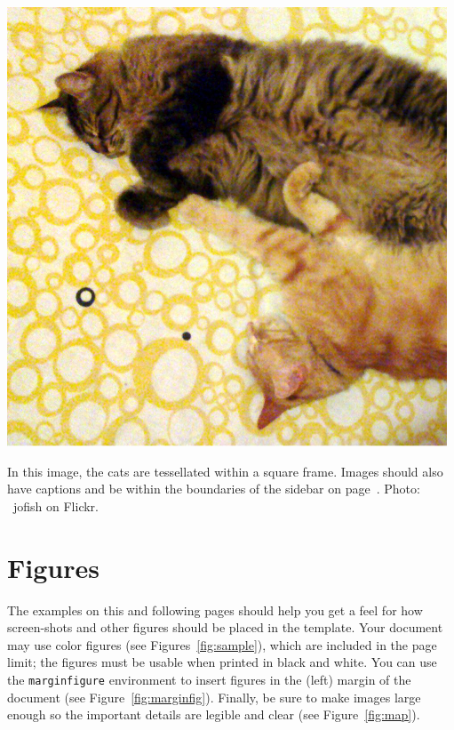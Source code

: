 \documentclass[sigchi-a, authorversion]{acmart}
\begin{document}
\begin{marginfigure}
    \includegraphics[width=\marginparwidth]{cats}
    \caption{In this image, the cats are tessellated within a square
      frame. Images should also have captions and be within the
      boundaries of the sidebar on page~\pageref{bar:sidebar}. Photo:
      \cczero~jofish on Flickr.}
    \label{fig:marginfig}
\end{marginfigure}

\section{Figures}
The examples on this and following pages should help you get a feel
for how screen-shots and other figures should be placed in the
template. Your document may use color figures (see
Figures~\ref{fig:sample}), which are included in the page limit; the
figures must be usable when printed in black and white. You can use
the \texttt{marginfigure} environment to insert figures in the (left) margin
of the document (see Figure~\ref{fig:marginfig}). Finally, be sure to
make images large enough so the important details are legible and
clear (see Figure~\ref{fig:map}).
\end{document}

